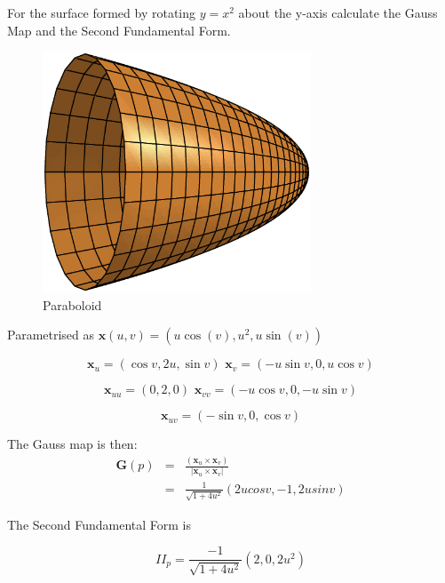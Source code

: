 \begin{example}

For the surface formed by rotating $y=x^2$ about the y-axis calculate the Gauss Map and the Second Fundamental Form. 

\begin{figure}[htbp]
	\centering
       \includegraphics[width=8cm]{Images/Paraboloid.eps}
   \caption{Paraboloid}
   \label{fig:paraboloid}
\end{figure} 

Parametrised as $ \mathbf x(u,v) = (u\cos(v),u^2,u\sin(v))$

\begin{displaymath}
\mathbf x_u = (\cos v, 2u , \sin v) \, \,
\mathbf x_v = (-u \sin v, 0, u \cos v)
\end{displaymath}

\begin{displaymath}
\mathbf x_{uu} = (0, 2 , 0) \, \,
\mathbf x_{vv} = (- u \cos v, 0, - u  \sin v)
\end{displaymath}

\begin{displaymath}
\mathbf x_{uv} = (- \sin v, 0 , \cos v)
\end{displaymath}

The Gauss map is then:
\begin{eqnarray}
\nonumber
\mathbf G(p) &=& \frac{(\mathbf x_u \times \mathbf x_v)}{|\mathbf x_u \times \mathbf x_v|} \\ 
\nonumber
&=&\frac{1}{\sqrt{1+4u^2}}(2u cos v , -1 ,2u sin v)
\end{eqnarray}

The Second Fundamental Form is

\begin{displaymath}
II_p = \frac {-1}{\sqrt{1+4u^2}}(2,0, 2u^2)
\end{displaymath}


\end{example}

